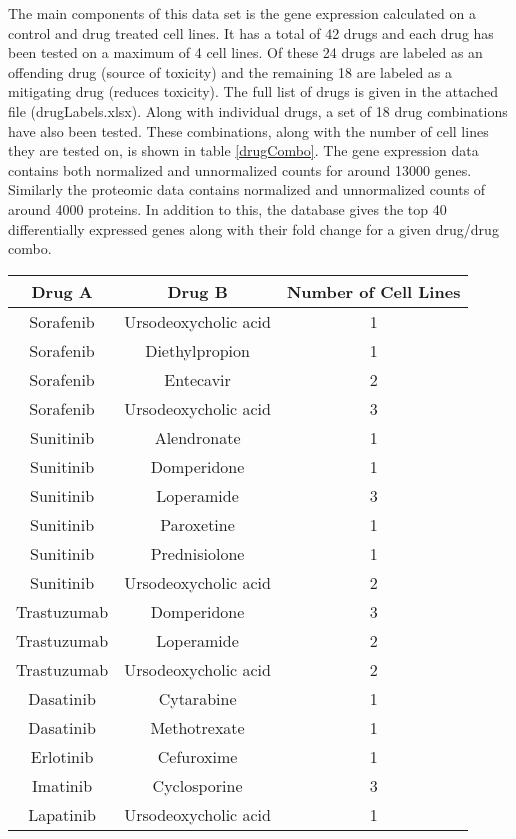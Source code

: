 \documentclass[]{article}
\begin{document}
The main components of this data set is the gene expression calculated on a control and drug treated cell lines. It has a total of 42 drugs and each drug has been tested on a maximum of 4 cell lines.
Of these 24 drugs are labeled as an offending drug (source of toxicity) and the remaining 18 are labeled as a mitigating drug (reduces toxicity). The full list of drugs is given in the attached file (drugLabels.xlsx).
Along with individual drugs, a set of 18 drug combinations have also been tested. These combinations, along with the number of cell lines they are tested on, is shown in table \ref{drugCombo}. 
The gene expression data contains both normalized and unnormalized counts for around 13000 genes. Similarly the proteomic data contains normalized and unnormalized counts of around 4000 proteins.
In addition to this, the database gives the top 40 differentially expressed genes along with their fold change for a given drug/drug combo.

\begin{table*}
	\centering
	\caption{Drug Combinations in the DToxS Dataset.}
		\label{drugCombo}
\begin{tabular}{| c | c | c |}
	\hline
	Drug A & Drug B & Number of Cell Lines \\
	\hline
	Sorafenib & Ursodeoxycholic acid & 1 \\
	Sorafenib & Diethylpropion & 1\\
	Sorafenib & Entecavir & 2\\
	Sorafenib & Ursodeoxycholic acid & 3\\
	Sunitinib & Alendronate & 1 \\
	Sunitinib & Domperidone & 1\\
	Sunitinib & Loperamide & 3\\
	Sunitinib & Paroxetine & 1\\
	Sunitinib & Prednisiolone & 1\\
	Sunitinib & Ursodeoxycholic acid & 2\\
	Trastuzumab & Domperidone & 3\\
	Trastuzumab & Loperamide & 2\\
	Trastuzumab & Ursodeoxycholic acid & 2\\
	Dasatinib & Cytarabine & 1\\
	Dasatinib & Methotrexate & 1\\
	Erlotinib & Cefuroxime & 1\\
	Imatinib & Cyclosporine & 3 \\
	Lapatinib & Ursodeoxycholic acid & 1 \\
	\hline
\end{tabular}
\end{table*}



\end{document}
